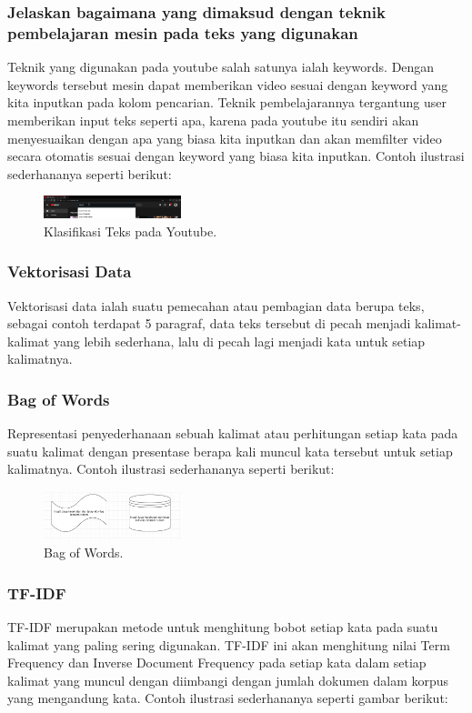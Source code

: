 \subsubsection{Jelaskan bagaimana yang dimaksud dengan teknik pembelajaran mesin pada teks yang digunakan}
\hfill\break
Teknik yang digunakan pada youtube salah satunya ialah keywords. Dengan keywords tersebut mesin dapat memberikan video sesuai dengan keyword yang kita inputkan pada kolom pencarian. Teknik pembelajarannya tergantung user memberikan input teks seperti apa, karena pada youtube itu sendiri akan menyesuaikan dengan apa yang biasa kita inputkan dan akan memfilter video secara otomatis sesuai dengan keyword yang biasa kita inputkan. Contoh ilustrasi sederhananya seperti berikut:

\begin{figure}[H]
\centering
\includegraphics[width=4cm]{figures/1174067/4/3.jpg}
\caption{Klasifikasi Teks pada Youtube.}
\end{figure}

\subsubsection{Vektorisasi Data}
\hfill\break
Vektorisasi data ialah suatu pemecahan atau pembagian data berupa teks, sebagai contoh terdapat 5 paragraf, data teks tersebut di pecah menjadi kalimat-kalimat yang lebih sederhana, lalu di pecah lagi menjadi kata untuk setiap kalimatnya. 

\subsubsection{Bag of Words}
\hfill\break
Representasi penyederhanaan sebuah kalimat atau perhitungan setiap kata pada suatu kalimat dengan presentase berapa kali muncul kata tersebut untuk setiap kalimatnya. Contoh ilustrasi sederhananya seperti berikut: 

\begin{figure}[H]
\centering
\includegraphics[width=4cm]{figures/1174067/4/4.jpg}
\caption{Bag of Words.}
\end{figure}

\subsubsection{TF-IDF}
\hfill\break
TF-IDF merupakan metode untuk menghitung bobot setiap kata pada suatu kalimat yang paling sering digunakan. TF-IDF ini akan menghitung nilai Term Frequency dan Inverse Document Frequency pada setiap kata dalam setiap kalimat yang muncul dengan diimbangi dengan jumlah dokumen dalam korpus yang mengandung kata. Contoh ilustrasi sederhananya seperti gambar berikut: 

